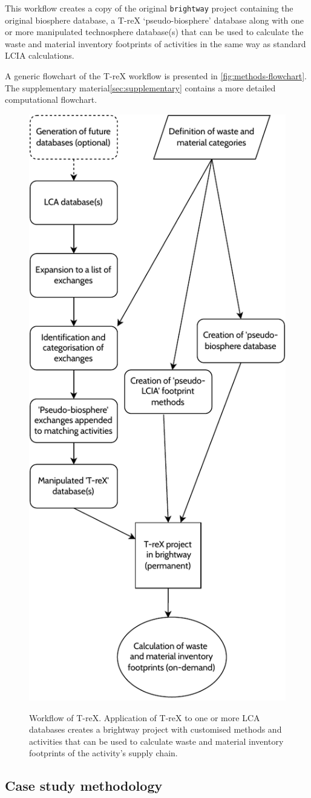 This workflow creates a copy of the original \texttt{brightway} project containing the original biosphere database, a T-reX `pseudo-biosphere' database along with one or more manipulated technosphere database(s) that can be used to calculate the waste and material inventory footprints of activities in the same way as standard LCIA calculations.

A generic flowchart of the T-reX workflow is presented in \autoref{fig:methods-flowchart}. The supplementary material\autoref{sec:supplementary} contains a more detailed computational flowchart.

\begin{figure}[H]
    \centering
    \caption{Workflow of T-reX. Application of T-reX to one or more LCA databases creates a brightway project with customised methods and activities that can be used to calculate waste and material inventory footprints of the activity's supply chain.}
    \includegraphics[width=0.5\linewidth]{figures/T-reX_method.pdf}
    \label{fig:methods-flowchart}
\end{figure}


\subsection{Case study methodology}\label{sec:method-case_study}

